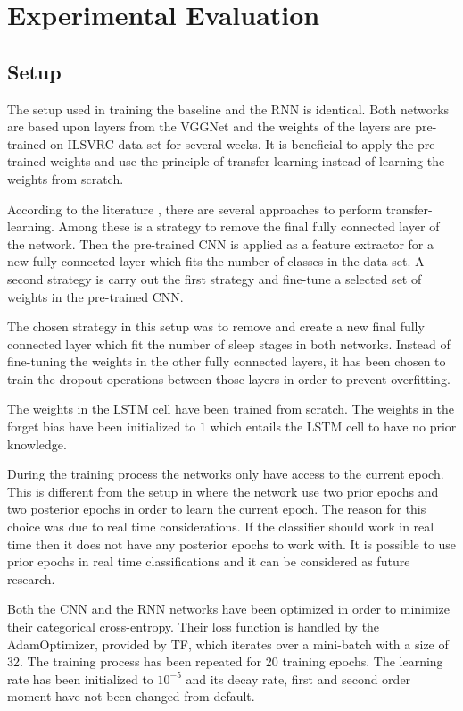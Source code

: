 \section{Experimental Evaluation}
\subsection{Setup}

The setup used in training the baseline and the RNN is identical. Both networks are based upon layers from the VGGNet and the weights of the layers are pre-trained on ILSVRC data set for several weeks. It is beneficial to apply the pre-trained weights and use the principle of transfer learning instead of learning the weights from scratch. 

According to the literature \cite{stand_cnn_notes_1}, there are several approaches to perform transfer-learning. Among these is a strategy to remove the final fully connected layer of the network. Then the pre-trained CNN is applied as a feature extractor for a new fully connected layer which fits the number of classes in the data set.
A second strategy is carry out the first strategy and fine-tune a selected set of weights in the pre-trained CNN.

The chosen strategy in this setup was to remove and create a new final fully connected layer which fit the number of sleep stages in both networks. Instead of fine-tuning the weights in the other fully connected layers, it has been chosen to train the dropout operations between those layers in order to prevent overfitting. 

The weights in the LSTM cell have been trained from scratch. The weights in the forget bias have been initialized to $1$ which entails the LSTM cell to have no prior knowledge.

During the training process the networks only have access to the current epoch. This is different from the setup in \cite{main_ar} where the network use two prior epochs and two posterior epochs in order to learn the current epoch. The reason for this choice was due to real time considerations. If the classifier should work in real time then it does not have any posterior epochs to work with. 
It is possible to use prior epochs in real time classifications and it can be considered as future research.

Both the CNN and the RNN networks have been optimized in order to minimize their categorical cross-entropy. Their loss function is handled by the AdamOptimizer, provided by TF, which iterates over a mini-batch with a size of 32. 
The training process has been repeated for 20 training epochs. The learning rate has been initialized to $10^{-5}$ and its decay rate, first and second order moment have not been changed from default.

